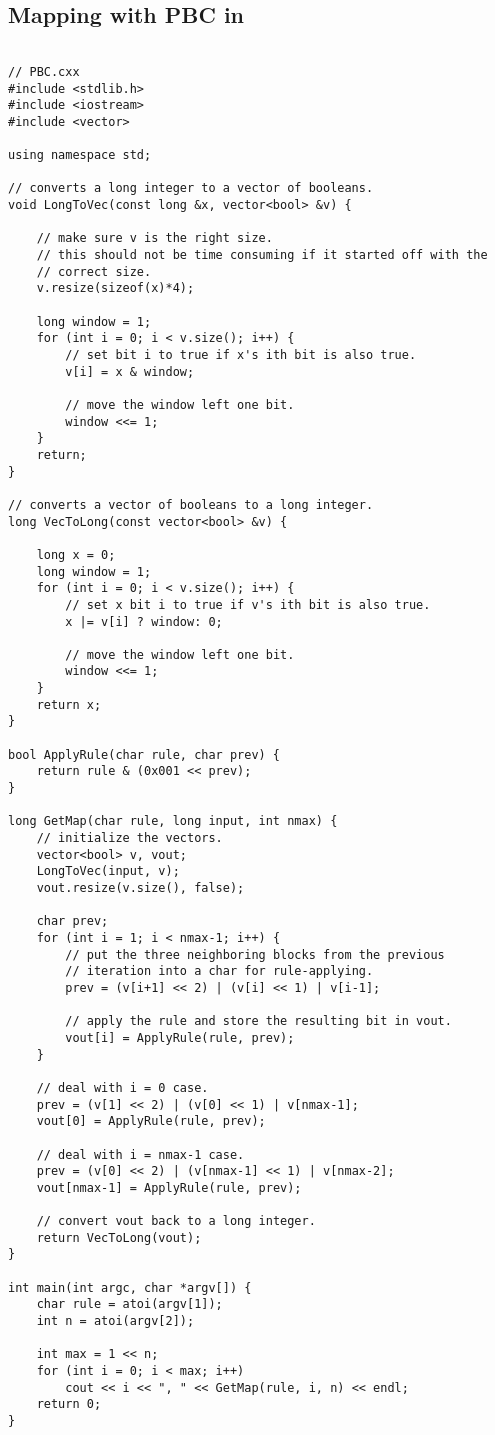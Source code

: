 \subsection{Mapping with PBC in }
\small
\begin{verbatim}

// PBC.cxx
#include <stdlib.h>
#include <iostream>
#include <vector>

using namespace std;

// converts a long integer to a vector of booleans.
void LongToVec(const long &x, vector<bool> &v) {

    // make sure v is the right size.
    // this should not be time consuming if it started off with the
    // correct size.
    v.resize(sizeof(x)*4);

    long window = 1;
    for (int i = 0; i < v.size(); i++) {
        // set bit i to true if x's ith bit is also true.
        v[i] = x & window;

        // move the window left one bit.
        window <<= 1;
    }
    return;
}

// converts a vector of booleans to a long integer.
long VecToLong(const vector<bool> &v) {

    long x = 0;
    long window = 1;
    for (int i = 0; i < v.size(); i++) {
        // set x bit i to true if v's ith bit is also true.
        x |= v[i] ? window: 0;

        // move the window left one bit.
        window <<= 1;
    }
    return x;
}

bool ApplyRule(char rule, char prev) {
    return rule & (0x001 << prev);
}

long GetMap(char rule, long input, int nmax) {
    // initialize the vectors.
    vector<bool> v, vout;
    LongToVec(input, v);
    vout.resize(v.size(), false);

    char prev;
    for (int i = 1; i < nmax-1; i++) {
        // put the three neighboring blocks from the previous
        // iteration into a char for rule-applying.
        prev = (v[i+1] << 2) | (v[i] << 1) | v[i-1];

        // apply the rule and store the resulting bit in vout.
        vout[i] = ApplyRule(rule, prev);
    }

    // deal with i = 0 case.
    prev = (v[1] << 2) | (v[0] << 1) | v[nmax-1];
    vout[0] = ApplyRule(rule, prev);

    // deal with i = nmax-1 case.
    prev = (v[0] << 2) | (v[nmax-1] << 1) | v[nmax-2];
    vout[nmax-1] = ApplyRule(rule, prev);

    // convert vout back to a long integer.
    return VecToLong(vout);
}

int main(int argc, char *argv[]) {
    char rule = atoi(argv[1]);
    int n = atoi(argv[2]);

    int max = 1 << n;
    for (int i = 0; i < max; i++)
        cout << i << ", " << GetMap(rule, i, n) << endl;
    return 0;
}

\end{verbatim}
\normalsize
